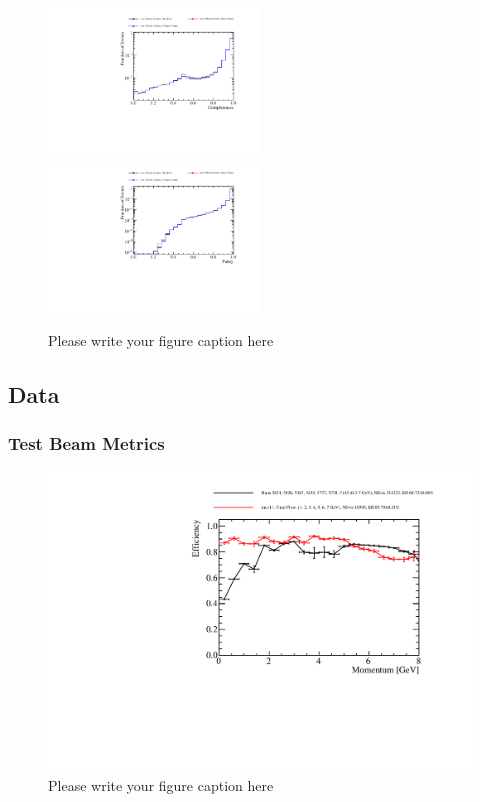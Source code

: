 \begin{figure}
\includegraphics[width=0.5\textwidth]{Figures/Metrics/MC/Cosmics/CosmicRayCompleteness.pdf}
\includegraphics[width=0.5\textwidth]{Figures/Metrics/MC/Cosmics/CosmicRayPurity.pdf}
\caption{Please write your figure caption here}
\label{fig:4}
\end{figure}

\subsection{Data}

\subsubsection{Test Beam Metrics}

\begin{figure}
\includegraphics[width=1.0\textwidth]{Figures/Metrics/Data/Beam/BeamParticleEfficiencyVsMomentum.pdf}
\caption{Please write your figure caption here}
\label{fig:5}
\end{figure}


